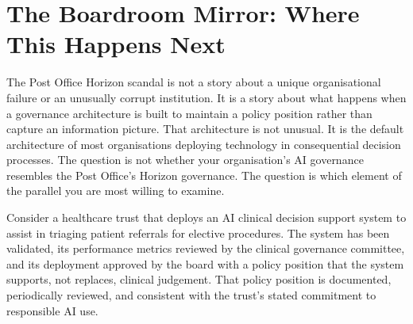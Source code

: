 \scenebreak

\section{The Boardroom Mirror: Where This Happens Next}

The Post Office Horizon scandal is not a story about a unique organisational failure or an unusually corrupt institution. It is a story about what happens when a governance architecture is built to maintain a policy position rather than capture an information picture. That architecture is not unusual. It is the default architecture of most organisations deploying technology in consequential decision processes. The question is not whether your organisation's AI governance resembles the Post Office's Horizon governance. The question is which element of the parallel you are most willing to examine.

Consider a healthcare trust that deploys an AI clinical decision support system to assist in triaging patient referrals for elective procedures. The system has been validated, its performance metrics reviewed by the clinical governance committee, and its deployment approved by the board with a policy position that the system supports, not replaces, clinical judgement. That policy position is documented, periodically reviewed, and consistent with the trust's stated commitment to responsible AI use.

